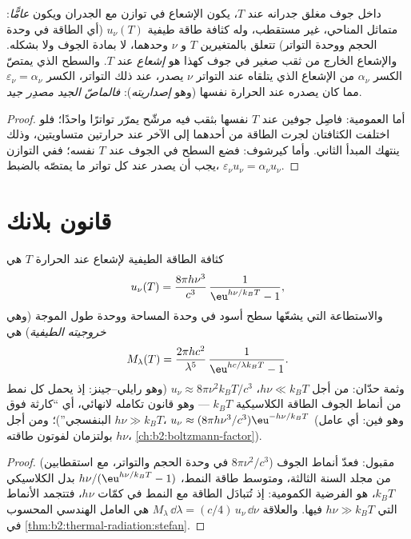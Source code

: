 \begin{proposition}\label{prop:b2:thermal-radiation:kirchhoff}
داخل جوف مغلق جدرانه عند $T$، يكون الإشعاع في
توازن مع الجدران ويكون \emph{عامًّا}: متماثل المناحي،
غير مستقطب، وله كثافة طاقة طيفية $u_\nu(T)$ (أي الطاقة في وحدة
الحجم ووحدة التواتر) تتعلق بالمتغيرين $T$ و $\nu$ وحدهما، لا بمادة
الجوف ولا بشكله. والإشعاع الخارج من ثقب صغير في
جوف كهذا هو \emph{إشعاع } عند $T$. والسطح الذي
يمتصّ الكسر $\alpha_\nu$ من الإشعاع الذي يتلقاه عند
التواتر $\nu$ يصدر، عند ذلك التواتر، الكسر
$\varepsilon_\nu = \alpha_\nu$ مما كان يصدره  عند الحرارة
نفسها (وهو \emph{إصداريته}):
\emph{فالماصّ الجيد مصدِر جيد}.
\end{proposition}

\begin{proof}
أما العمومية: فاصِل جوفين عند $T$ نفسها بثقب فيه
مرشّح يمرّر تواترًا واحدًا؛ فلو اختلفت الكثافتان لجرت الطاقة
من أحدهما إلى الآخر عند حرارتين متساويتين، وذلك ينتهك المبدأ
الثاني. وأما كيرشوف: فضع السطح في الجوف عند $T$ نفسه؛ ففي
التوازن يجب أن يصدر عند كل تواتر ما يمتصّه بالضبط،
$\varepsilon_\nu u_\nu = \alpha_\nu u_\nu$.
\end{proof}

\section{قانون بلانك}

\begin{theorem}\label{thm:b2:thermal-radiation:planck}
كثافة الطاقة الطيفية لإشعاع  عند الحرارة
$T$ هي
\[
u_\nu(T) = \frac{8\pi h\nu^3}{c^3}\,\frac{1}{\eu^{h\nu/k_BT} - 1},
\]
والاستطاعة التي يشعّها سطح أسود في وحدة المساحة ووحدة
طول الموجة (وهي \emph{خروجيته الطيفية}) هي
\[
M_\lambda(T) = \frac{2\pi hc^2}{\lambda^5}\,\frac{1}{\eu^{hc/\lambda k_BT} - 1}.
\]
وثمة حدّان: من أجل $h\nu \ll k_BT$، $u_\nu \approx 8\pi\nu^2 k_BT/c^3$
(وهو رايلي--جينز: إذ يحمل كل نمط من أنماط الجوف الطاقة الكلاسيكية
$k_BT$ --- وهو قانون تكامله لانهائي، أي ``كارثة
فوق البنفسجي'')؛ ومن أجل $h\nu \gg k_BT$، $u_\nu \approx (8\pi h\nu^3/c^3)
\eu^{-h\nu/k_BT}$ (وهو فين: أي عامل بولتزمان لفوتون طاقته
$h\nu$، \cref{ch:b2:boltzmann-factor}).
\end{theorem}

\begin{proof}
مقبول: فعدّ أنماط الجوف ($8\pi\nu^2/c^3$ في وحدة
الحجم والتواتر، مع استقطابين) من مجلد السنة الثالثة،
ومتوسط طاقة النمط، $h\nu/(\eu^{h\nu/k_BT} - 1)$ بدل
الكلاسيكي $k_BT$، هو الفرضية الكمومية: إذ تُتبادَل الطاقة مع
النمط في كمّات $h\nu$، فتتجمد الأنماط التي $h\nu \gg k_BT$
فيها. والعلاقة $M_\lambda\,\dd\lambda = (c/4)\,u_\nu\,\dd\nu$ هي
العامل الهندسي المحسوب في \cref{thm:b2:thermal-radiation:stefan}.
\end{proof}

